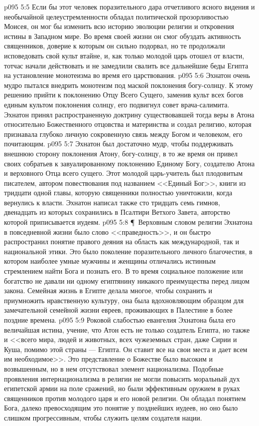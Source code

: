 \vs p095 5:5 Если бы этот человек поразительного дара отчетливого ясного видения и необычайной целеустремленности обладал политической прозорливостью Моисея, он мог бы изменить всю историю эволюции религии и откровения истины в Западном мире. Во время своей жизни он смог обуздать активность священников, доверие к которым он сильно подорвал, но те продолжали исповедовать свой культ втайне, и, как только молодой царь отошел от власти, тотчас начали действовать и не замедлили свалить все дальнейшие беды Египта на установление монотеизма во время его царствования.
\vs p095 5:6 Эхнатон очень мудро пытался внедрить монотеизм под маской поклонения богу\hyp{}солнцу. К этому решению прийти к поклонению Отцу Всего Сущего, заменив культ всех богов единым культом поклонения солнцу, его подвигнул совет врача\hyp{}салимита. Эхнатон принял распространенную доктрину существовавшей тогда веры в Атона относительно Божественного отцовства и материнства и создал религию, которая признавала глубоко личную сокровенную связь между Богом и человеком, его почитающим.
\vs p095 5:7 Эхнатон был достаточно мудр, чтобы поддерживать внешнюю сторону поклонения Атону, богу\hyp{}солнцу, в то же время он привел своих собратьев к завуалированному поклонению Единому Богу, создателю Атона и верховного Отца всего сущего. Этот молодой царь\hyp{}учитель был плодовитым писателем, автором повествования под названием <<Единый Бог>>, книги из тридцати одной главы, которую священники полностью уничтожили, когда вернулись к власти. Эхнатон написал также сто тридцать семь гимнов, двенадцать из которых сохранились в Псалтири Ветхого Завета, авторство которой приписывается иудеям.
\vs p095 5:8 \P\ Верховным словом религии Эхнатона в повседневной жизни было слово <<праведность>>, и он быстро распространил понятие правого деяния на область как международной, так и национальной этики. Это было поколение поразительного личного благочестия, в котором наиболее умные мужчины и женщины отличались истинным стремлением найти Бога и познать его. В то время социальное положение или богатство не давали ни одному египтянину никакого преимущества перед лицом закона. Семейная жизнь в Египте делала многое, чтобы сохранить и приумножить нравственную культуру, она была вдохновляющим образцом для замечательной семейной жизни евреев, проживающих в Палестине в более поздние времена.
\vs p095 5:9 Роковой слабостью евангелия Эхнатона была его величайшая истина, учение, что Атон есть не только создатель Египта, но также и <<всего мира, людей и животных, всех чужеземных стран, даже Сирии и Куша, помимо этой страны --- Египта. Он ставит все на свои места и дает всем им необходимое>>. Это представление о Божестве было высоким и возвышенным, но в нем отсутствовал элемент национализма. Подобные проявления интернационализма в религии не могли повысить моральный дух египетской армии на поле сражений, но были эффективным оружием в руках священников против молодого царя и его новой религии. Он обладал понятием Бога, далеко превосходящим это понятие у позднейших иудеев, но оно было слишком прогрессивным, чтобы служить целям создателя нации.
